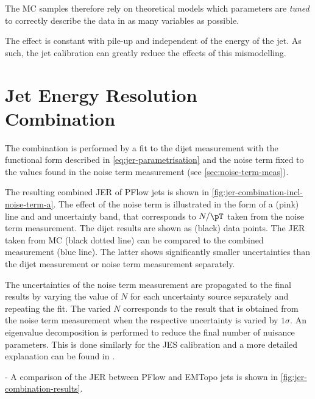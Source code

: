The MC samples therefore rely on theoretical models which parameters are \emph{tuned} to correctly describe the data in as many variables as possible.

The effect is constant with pile-up and independent of the energy of the jet. As such, the jet calibration can greatly reduce the effects of this mismodelling.



\section{Jet Energy Resolution Combination}

The combination is performed by a fit to the dijet measurement with the functional form described in \cref{eq:jer-parametrisation} and the noise term fixed to the values found in the noise term measurement (see \cref{sec:noise-term-meas}).

The resulting combined JER of PFlow jets is shown in \cref{fig:jer-combination-incl-noise-term-a}. The effect of the noise term is illustrated in the form of a (pink) line and and uncertainty band, that corresponds to $N / \pT$ taken from the noise term measurement. The dijet results are shown as (black) data points.
The JER taken from MC (black dotted line) can be compared to the combined \insitu measurement (blue line). The latter shows significantly smaller uncertainties than the dijet measurement or noise term measurement separately. 

The uncertainties of the noise term measurement are propagated to the final results by varying the value of $N$ for each uncertainty source separately and repeating the fit. The varied $N$ corresponds to the result that is obtained from the noise term measurement when the respective uncertainty is varied by $1\sigma$.
An eigenvalue decomposition is performed to reduce the final number of nuisance parameters. This is done similarly for the JES calibration and a more detailed explanation can be found in .

- A comparison of the JER between PFlow and EMTopo jets is shown in \cref{fig:jer-combination-results}.

